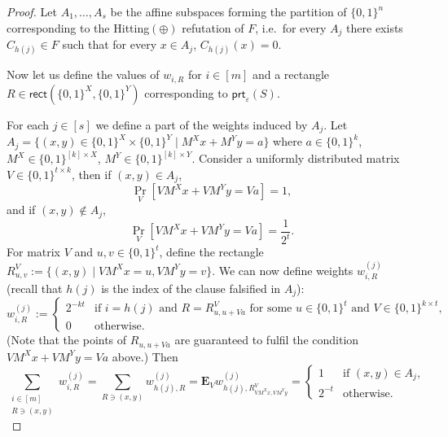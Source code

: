 \documentclass[11pt]{article}
\newcommand{\scterm}[1]{{\textrm{\sc #1}}}
\newcommand{\hit}{\scterm{Hitting}}
\newcommand{\hitp}{{\hit}$(\oplus)$}
\newcommand{\rect}{\mathsf{rect}}
\newcommand{\recttwo}[2]{\rect(#1,#2)}
\newcommand{\prt}{\mathsf{prt}}
\newcommand{\E}{\mathbf{E}}
\numberwithin{equation}{section}
\begin{document}
\begin{proof}
 
   Let $A_1, \dots, A_s$ be the affine subspaces forming the partition of $\{0,1\}^n$ corresponding to the {\hitp} refutation of $F$, i.e.\ for every $A_j$ there exists $C_{h(j)} \in F$ such that for every $x \in A_j$, $C_{h(j)}(x) = 0$. 

    Now let us define the values of $w_{i, R}$ for $i \in [m]$ and a rectangle $R \in \recttwo{\{0,1\}^X}{\{0,1\}^Y}$ corresponding to $\prt_\varepsilon(S)$. 
    
    For each $j \in [s]$ we define a part of the weights induced by $A_j$. Let $A_j = \{(x,y) \in \{0,1\}^X \times \{0,1\}^Y \mid M^X x + M^Y y = a\}$ where $a \in \{0,1\}^k$, $M^X \in \{0,1\}^{[k] \times X}$, $M^Y \in \{0,1\}^{[k] \times Y}$. Consider a uniformly distributed matrix $V \in \{0,1\}^{t \times k}$, then if $(x,y) \in A_j$,
       \[\Pr_V \left[ V M^X x + V M^Y y = V a \right] = 1,\]
    and if $(x,y) \not\in A_j$,
       \[\Pr_V \left[ V M^X x + V M^Y y = V a \right] = \frac{1}{2^t}.\]
    For matrix $V$ and $u,v \in \{0,1\}^t$, define the rectangle
$R^V_{u,v} := \{(x,y) \mid V M^X x = u, V M^Y y = v\}$. We can now define weights $w^{(j)}_{i, R}$ (recall that $h(j)$ is the index of the clause falsified in $A_j$):
       \[ w^{(j)}_{i, R} := 
       \begin{cases} 
        2^{-kt} & \text{if } i=h(j) \text{ and } R = R^V_{u,u + V a}  \text{ for some } u \in \{0,1\}^t\text{ and } V \in \{0,1\}^{k \times t}, \\ 
        0 & \text{otherwise}. 
       \end{cases} \]
(Note that the points of $R_{u,u+Va}$ are guaranteed to fulfil the condition $V M^X x + V M^Y y = V a$ above.)
    Then
      \[ \sum_{\substack{i \in [m]\\ R \ni (x,y)}} w^{(j)}_{i, R} = \sum_{R \ni (x,y)} w^{(j)}_{h(j), R} =  \E_V w^{(j)}_{\displaystyle h(j),R^V_{\scriptstyle VM^{\!X} x, VM^{\!Y} y}} = \begin{cases} 1 & \text{if } (x,y) \in A_j, \\ 2^{-t} & \text{otherwise}. \end{cases}\]
    

\end{proof}
\end{document}
